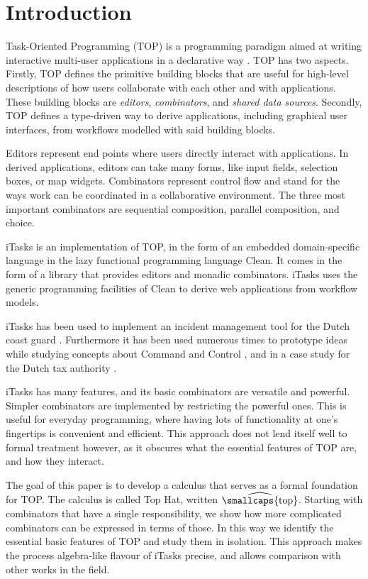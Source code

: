 
\section{Introduction}

Task-Oriented Programming (TOP) is a programming paradigm aimed at writing interactive multi-user applications in a declarative way \cite{conf/ppdp/PlasmeijerLMAK12}.
TOP has two aspects.
Firstly, TOP defines the primitive building blocks that are useful for high-level descriptions of how users collaborate with each other and with applications.
These building blocks are \emph{editors}, \emph{combinators}, and \emph{shared data sources}.
Secondly, TOP defines a type-driven way to derive applications, including graphical user interfaces, from workflows modelled with said building blocks.

Editors represent end points where users directly interact with applications.
In derived applications, editors can take many forms, like input fields, selection boxes, or map widgets.
Combinators represent control flow and stand for the ways work can be coordinated in a collaborative environment.
The three most important combinators are sequential composition, parallel composition, and choice.

iTasks is an implementation of TOP, in the form of an embedded domain-specific language in the lazy functional programming language Clean.
It comes in the form of a library that provides editors and monadic combinators.
iTasks uses the generic programming facilities of Clean to derive web applications from workflow models.

iTasks has been used to implement an incident management tool for the Dutch coast guard \cite{conf/iscram/LijnseJP12}.
Furthermore it has been used numerous times to prototype ideas while studying concepts about Command and Control \cite{theses/nlda/Kool17, theses/radboud/Stutterheim17}, and in a case study for the Dutch tax authority \cite{conf/sfp/StutterheimAP17}.

iTasks has many features, and its basic combinators are versatile and powerful.
Simpler combinators are implemented by restricting the powerful ones.
This is useful for everyday programming, where having lots of functionality at one's fingertips is convenient and efficient.
This approach does not lend itself well to formal treatment however, as it obscures what the essential features of TOP are, and how they interact.

The goal of this paper is to develop a calculus that serves as a formal foundation for TOP.
The calculus is called Top Hat, written $\widehat{\text{\smallcaps{top}}}$.
Starting with combinators that have a single responsibility, we show how more complicated combinators can be expressed in terms of those.
In this way we identify the essential basic features of TOP and study them in isolation.
This approach makes the process algebra-like flavour of iTasks precise, and allows comparison with other works in the field.
